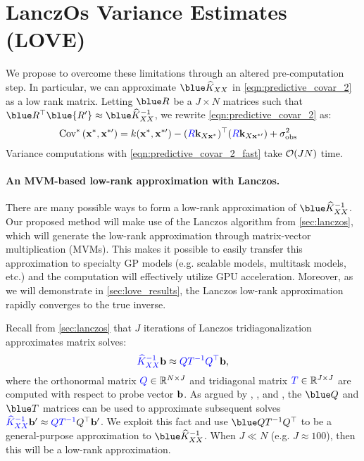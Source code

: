 \section{LanczOs Variance Estimates (LOVE)}
\label{sec:love_method}



We propose to overcome these limitations through an altered pre-computation step.
In particular, we can approximate $\blue \trainK$ in \cref{eqn:predictive_covar_2} as a low rank matrix.
Letting $\blue \bR$ be a $J \times N$ matrices such that $\blue \bR^\top \blue{\bR'} \approx \blue \trainK^{-1}$, we rewrite \cref{eqn:predictive_covar_2} as:
%
\begin{align}
  \text{Cov}^* \left( \mathbf{x}^*, \mathbf{x}^{*\prime} \right)
  &= k(\mathbf{x}^*, \mathbf{x}^{*\prime}) - ({\color{blue} R} \mathbf{k}_{X\mathbf{x}^*})^\top ({\color{blue} R} \mathbf{k}_{X\mathbf{x}^{*\prime}}) + \sigma^2_\text{obs}
  \label{eqn:predictive_covar_2_fast}
\end{align}
%
Variance computations with \cref{eqn:predictive_covar_2_fast} take $\bigo{JN}$ time.

\paragraph{An MVM-based low-rank approximation with Lanczos.}
There are many possible ways to form a low-rank approximation of $\blue \trainK^{-1}$.
Our proposed method will make use of the Lanczos algorithm from \cref{sec:lanczos}, which will generate the low-rank approximation through matrix-vector multiplication (MVMs).
This makes it possible to easily transfer this approximation to specialty GP models (e.g. scalable models, multitask models, etc.) and the computation will effectively utilize GPU acceleration.
Moreover, as we will demonstrate in \cref{sec:love_results}, the Lanczos low-rank approximation rapidly converges to the true inverse.

Recall from \cref{sec:lanczos} that $J$ iterations of Lanczos tridiagonalization approximates matrix solves:
\[
  {\color{blue} \widehat{K}_{XX}^{-1}} \mathbf{b} \approx {\color{blue} \ensuremath{Q}\ensuremath{T}^{-1} \ensuremath{Q}^{\top}} \mathbf{b},
\]
where the orthonormal matrix ${\color{blue} Q} \in \mathbb{R}^{N \times J}$ and tridiagonal matrix ${\color{blue} T} \in \mathbb{R}^{J \times J}$ are computed with respect to probe vector $\mathbf{b}$.
As argued by \citet{parlett1980new}, \citet{saad1987lanczos}, and \citet{schneider2001krylov}, the $\blue \bQ$ and $\blue \bT$ matrices can be used to approximate subsequent solves
${\color{blue} \widehat{K}_{XX}^{-1}} \mathbf{b}' \approx {\color{blue} \ensuremath{Q}\ensuremath{T}^{-1}} Q^\top \mathbf{b}'$.
We exploit this fact and use $\blue \bQ \bT^{-1} \bQ^\top$ to be a general-purpose approximation to $\blue \trainK^{-1}$.
When $J \ll N$ (e.g. $J \approx 100$), then this will be a low-rank approximation.

